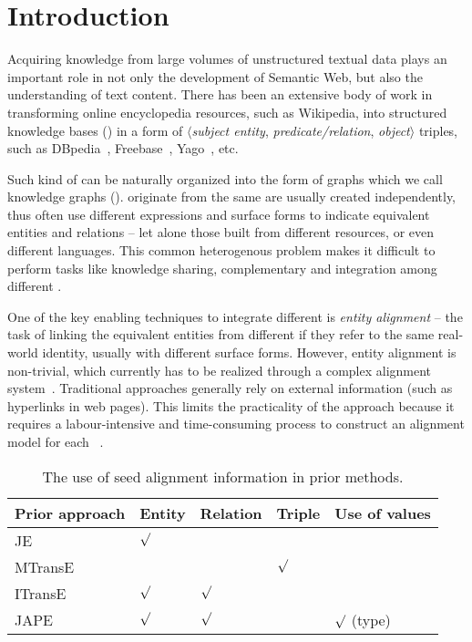 	
	\section{Introduction}
	\label{section:intro}
    Acquiring knowledge from large volumes of unstructured textual data plays an important role in not only the development of Semantic
    Web, but also the understanding of text content. There has been an extensive body of work in transforming online encyclopedia resources, such as
    Wikipedia, into structured knowledge bases (\KBs) in a form of $\langle$\emph{subject entity},
   \emph{ predicate/relation}, \emph{object}$\rangle$ triples, such as DBpedia~\cite{Lehmann2009DBpedia,Auer2007DBpedia},
    Freebase~\cite{Bollacker2007Freebase}, Yago~\cite{Suchanek2008YAGO}, etc.
    	


	Such kind of \KBs can be naturally organized into the form of graphs which we call knowledge graphs (\KGs). \KGs originate from the
same \KB  are usually created independently, thus often use different expressions and surface forms to indicate equivalent entities and
relations -- let alone those built from different resources, or even different languages. This common heterogenous problem makes it
difficult to perform tasks like knowledge sharing, complementary and integration among different \KGs.
	
	One of the key enabling techniques to integrate different \KGs is \emph{entity alignment} -- the task of linking the equivalent
entities from different \KGs if they refer to the same real-world identity, usually with different surface forms. However, entity alignment
is non-trivial, which currently has to be realized through a complex alignment system~\cite{gokhale2014corleone,scharffe2014ontology}.
Traditional approaches generally rely on external information (such as hyperlinks in web pages). This limits the practicality of the
approach because it requires a labour-intensive and time-consuming process to construct an alignment model for each
\KG~\cite{zhu2017iterative}.


\begin{table}[t!]
	\centering
	\scriptsize
	\begin{tabular}{lllll}
		\toprule
		\bf Prior approach & \bf Entity & \bf Relation & \bf Triple & \bf Use of values \\
		\midrule
		\rowcolor{Gray} JE~\cite{hao2016joint} & ${\surd}$ & & & \\
		MTransE~\cite{chen2016multilingual} & $ $ & $ $ & ${\surd}$ & \\
		\rowcolor{Gray} ITransE~\cite{zhu2017iterative} & ${\surd}$ & ${\surd}$& & \\
		JAPE~\cite{sun2017cross} & ${\surd}$& ${\surd}$& & ${\surd}$ (type)\\
		\bottomrule
	\end{tabular}
	\caption{\small The use of seed alignment information in prior methods.}
	\label{seed}
\end{table}
	
